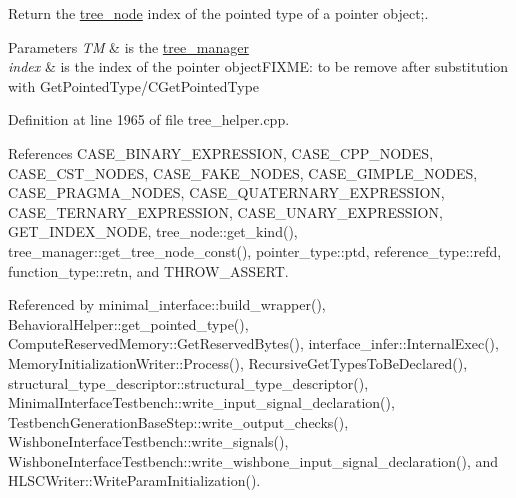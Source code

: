 Return the \hyperlink{classtree__node}{tree\+\_\+node} index of the pointed type of a pointer object;. 


\begin{DoxyParams}{Parameters}
{\em TM} & is the \hyperlink{classtree__manager}{tree\+\_\+manager} \\
\hline
{\em index} & is the index of the pointer object\+F\+I\+X\+ME\+: to be remove after substitution with Get\+Pointed\+Type/\+C\+Get\+Pointed\+Type \\
\hline
\end{DoxyParams}


Definition at line 1965 of file tree\+\_\+helper.\+cpp.



References C\+A\+S\+E\+\_\+\+B\+I\+N\+A\+R\+Y\+\_\+\+E\+X\+P\+R\+E\+S\+S\+I\+ON, C\+A\+S\+E\+\_\+\+C\+P\+P\+\_\+\+N\+O\+D\+ES, C\+A\+S\+E\+\_\+\+C\+S\+T\+\_\+\+N\+O\+D\+ES, C\+A\+S\+E\+\_\+\+F\+A\+K\+E\+\_\+\+N\+O\+D\+ES, C\+A\+S\+E\+\_\+\+G\+I\+M\+P\+L\+E\+\_\+\+N\+O\+D\+ES, C\+A\+S\+E\+\_\+\+P\+R\+A\+G\+M\+A\+\_\+\+N\+O\+D\+ES, C\+A\+S\+E\+\_\+\+Q\+U\+A\+T\+E\+R\+N\+A\+R\+Y\+\_\+\+E\+X\+P\+R\+E\+S\+S\+I\+ON, C\+A\+S\+E\+\_\+\+T\+E\+R\+N\+A\+R\+Y\+\_\+\+E\+X\+P\+R\+E\+S\+S\+I\+ON, C\+A\+S\+E\+\_\+\+U\+N\+A\+R\+Y\+\_\+\+E\+X\+P\+R\+E\+S\+S\+I\+ON, G\+E\+T\+\_\+\+I\+N\+D\+E\+X\+\_\+\+N\+O\+DE, tree\+\_\+node\+::get\+\_\+kind(), tree\+\_\+manager\+::get\+\_\+tree\+\_\+node\+\_\+const(), pointer\+\_\+type\+::ptd, reference\+\_\+type\+::refd, function\+\_\+type\+::retn, and T\+H\+R\+O\+W\+\_\+\+A\+S\+S\+E\+RT.



Referenced by minimal\+\_\+interface\+::build\+\_\+wrapper(), Behavioral\+Helper\+::get\+\_\+pointed\+\_\+type(), Compute\+Reserved\+Memory\+::\+Get\+Reserved\+Bytes(), interface\+\_\+infer\+::\+Internal\+Exec(), Memory\+Initialization\+Writer\+::\+Process(), Recursive\+Get\+Types\+To\+Be\+Declared(), structural\+\_\+type\+\_\+descriptor\+::structural\+\_\+type\+\_\+descriptor(), Minimal\+Interface\+Testbench\+::write\+\_\+input\+\_\+signal\+\_\+declaration(), Testbench\+Generation\+Base\+Step\+::write\+\_\+output\+\_\+checks(), Wishbone\+Interface\+Testbench\+::write\+\_\+signals(), Wishbone\+Interface\+Testbench\+::write\+\_\+wishbone\+\_\+input\+\_\+signal\+\_\+declaration(), and H\+L\+S\+C\+Writer\+::\+Write\+Param\+Initialization().


